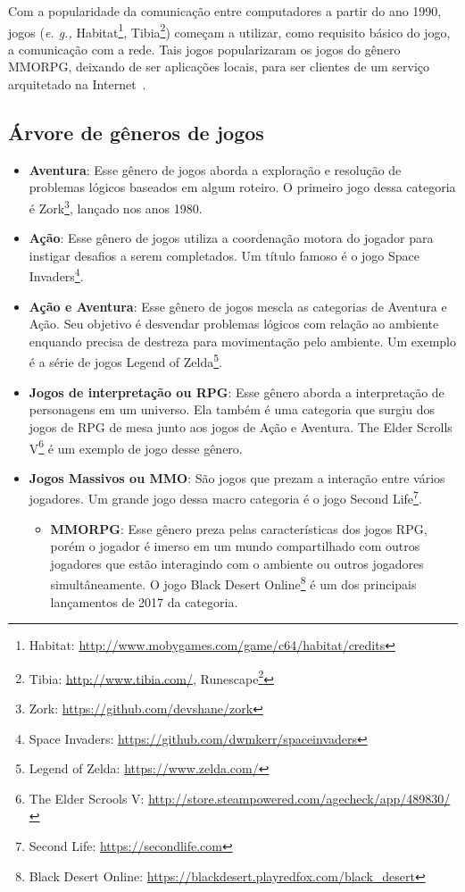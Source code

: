 Com a popularidade da comunicação entre computadores a partir do ano 1990, jogos (\textit{e. g.,} Habitat\footnote{Habitat: \url{http://www.mobygames.com/game/c64/habitat/credits}}, Tibia\footnote{Tibia: \url{http://www.tibia.com/}, Runescape\footnote{Runescape: \url{https:\\www.runescape.com}}}) começam a utilizar, como requisito básico do jogo, a comunicação com a rede.
%
Tais jogos popularizaram os jogos do gênero MMORPG, deixando de ser aplicações locais, para ser clientes de um serviço arquitetado na Internet~\cite{adams_1208533, Adams2014Jan}.



\subsection{Árvore de gêneros de jogos}
\label{sec:arvore_de_generos_de_jogos}




\begin{itemize}
  \item \textbf{Aventura}: Esse gênero de jogos aborda a exploração e resolução de problemas lógicos baseados em algum roteiro. O primeiro jogo dessa categoria é Zork\footnote{Zork: \url{https://github.com/devshane/zork}}, lançado nos anos 1980.
  \item \textbf{Ação}: Esse gênero de jogos utiliza a coordenação motora do jogador para instigar desafios a serem completados. Um título famoso é o jogo Space Invaders\footnote{Space Invaders: \url{https://github.com/dwmkerr/spaceinvaders}}.
  \item \textbf{Ação e Aventura}: Esse gênero de jogos mescla as categorias de Aventura e Ação. Seu objetivo é desvendar problemas lógicos com relação ao ambiente enquando precisa de destreza para movimentação pelo ambiente. Um exemplo é a série de jogos Legend of Zelda\footnote{Legend of Zelda: \url{https://www.zelda.com/}}.
  \item \textbf{Jogos de interpretação ou \ac{RPG}}: Esse gênero aborda a interpretação de personagens em um universo. Ela também é uma categoria que surgiu dos jogos de \ac{RPG} de mesa junto aos jogos de Ação e Aventura. The Elder Scrolls V\footnote{The Elder Scrools V: \url{http://store.steampowered.com/agecheck/app/489830/}} é um exemplo de jogo desse gênero.
  \item \textbf{Jogos Massivos ou \ac{MMO}}: São jogos que prezam a interação entre vários jogadores. Um grande jogo dessa macro categoria é o jogo Second Life\footnote{Second Life: \url{https://secondlife.com}}.
    \begin{itemize}
      \item \textbf{\ac{MMORPG}}: Esse gênero preza pelas características dos jogos RPG, porém o jogador é imerso em um mundo compartilhado com outros jogadores que estão interagindo com o ambiente ou outros jogadores simultâneamente. O jogo Black Desert Online\footnote{Black Desert Online: \url{https://blackdesert.playredfox.com/black_desert}} é um dos principais lançamentos de 2017 da categoria.
    \end{itemize}
\end{itemize}




